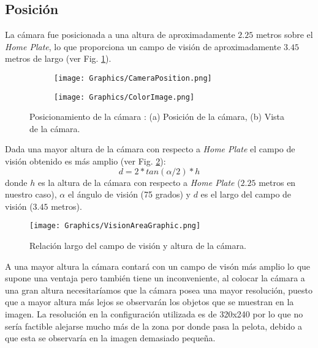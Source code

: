 \subsection{Posición}\label{sec:Position}

La cámara fue posicionada a una altura de aproximadamente $2.25$ metros sobre el \textit{Home Plate}, lo que proporciona un campo de visión de aproximadamente $3.45$ metros de largo (ver Fig. \ref{fig:CameraPosition}).

\begin{figure}[!h]
	\centering
	\begin{subfigure}[b]{0.4\linewidth}
		\texttt{[image: Graphics/CameraPosition.png]}
		\caption{}
	\end{subfigure}
	\begin{subfigure}[b]{0.4\linewidth}
		\texttt{[image: Graphics/ColorImage.png]}
		\caption{}
	\end{subfigure}
    \caption{Posicionamiento de la cámara : (a) Posición de la cámara, (b) Vista de la cámara.}
    \label{fig:CameraPosition}
\end{figure}

Dada una mayor altura de la cámara con respecto a \textit{Home Plate} el campo de visión obtenido es más amplio (ver Fig. \ref{fig:VisionAreaGraphic}):
$$d=2*tan(\alpha/2)*h$$
donde $h$ es la altura de la cámara con respecto a \textit{Home Plate} ($2.25$ metros en nuestro caso), $\alpha$ el ángulo de visión (75 grados) y $d$ es el largo del campo de visión ($3.45$ metros).

\begin{figure}[!h]
        \centering
        \texttt{[image: Graphics/VisionAreaGraphic.png]}
        \caption{Relación largo del campo de visión y altura de la cámara.}
        \label{fig:VisionAreaGraphic}
\end{figure}

A una mayor altura la cámara contará con un campo de visón más amplio lo que supone una ventaja pero también tiene un inconveniente, al colocar la cámara a una gran altura necesitaríamos que la cámara posea una mayor resolución, puesto que a mayor altura más lejos se observarán los objetos que se muestran en la imagen. La resolución en la configuración utilizada es de 320x240 por lo que no sería factible alejarse mucho más de la zona por donde pasa la pelota, debido a que esta se observaría en la imagen demasiado pequeña.

